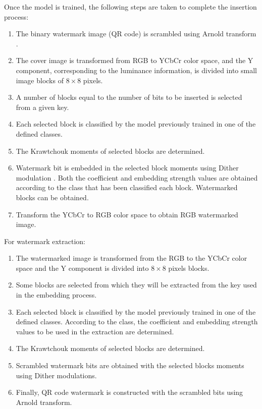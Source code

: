 \documentclass[runningheads]{llncs}
\begin{document}
Once the model is trained, the following steps are taken to complete the insertion process:
\begin{enumerate}
	\item The binary watermark image (QR code) is scrambled using Arnold transform \cite{Arnol'd:1987366}.
	\item The cover image is transformed from RGB to YCbCr color space, and the Y component, corresponding to the luminance information, is divided into small image blocks of $8\times 8$ pixels.
	\item A number of blocks equal to the number of bits to be inserted is selected from a given key.
	\item Each selected block is classified by the model previously trained in one of the defined classes.
	\item The Krawtchouk moments \cite{Yap2003} of selected blocks are determined.
	\item Watermark bit is embedded in the selected block moments using Dither modulation \cite{chen2001quantization}. Both the coefficient and embedding strength values are obtained according to the class that has been classified each block. Watermarked blocks can be obtained. 
	\item Transform the YCbCr to RGB color space to obtain RGB watermarked image.
\end{enumerate}

For watermark extraction:
\begin{enumerate}
	\item The watermarked image is transformed from the RGB to the YCbCr color space and the Y component is divided into $8\times 8$ pixels blocks.
	\item Some blocks are selected from which they will be extracted from the key used in the embedding process.
	\item Each selected block is classified by the model previously trained in one of the defined classes. According to the class, the coefficient and embedding strength values to be used in the extraction are determined.
	\item The Krawtchouk moments of selected blocks are determined.
	\item Scrambled watermark bits are obtained with the selected blocks moments using Dither modulations.
	\item Finally, QR code watermark is constructed with the scrambled bits using Arnold transform.
\end{enumerate}
\end{document}
